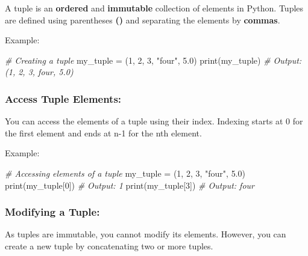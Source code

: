\documentclass[11pt]{article}
\newenvironment{Shaded}{}{}
\newcommand{\DecValTok}[1]{\textcolor[rgb]{0.25,0.63,0.44}{{#1}}}
\newcommand{\FloatTok}[1]{\textcolor[rgb]{0.25,0.63,0.44}{{#1}}}
\newcommand{\StringTok}[1]{\textcolor[rgb]{0.25,0.44,0.63}{{#1}}}
\newcommand{\CommentTok}[1]{\textcolor[rgb]{0.38,0.63,0.69}{\textit{{#1}}}}
\newcommand{\NormalTok}[1]{{#1}}
\newcommand{\OperatorTok}[1]{\textcolor[rgb]{0.40,0.40,0.40}{{#1}}}
\newcommand{\BuiltInTok}[1]{{#1}}
\begin{document}
A tuple is an \textbf{ordered} and \textbf{immutable} collection of
elements in Python. Tuples are defined using parentheses \textbf{()} and
separating the elements by \textbf{commas}.

Example:

\begin{Shaded}
\begin{Highlighting}[]
\CommentTok{\# Creating a tuple}
\NormalTok{my\_tuple }\OperatorTok{=}\NormalTok{ (}\DecValTok{1}\NormalTok{, }\DecValTok{2}\NormalTok{, }\DecValTok{3}\NormalTok{, }\StringTok{"four"}\NormalTok{, }\FloatTok{5.0}\NormalTok{)}
\BuiltInTok{print}\NormalTok{(my\_tuple)  }\CommentTok{\# Output: (1, 2, 3, \textquotesingle{}four\textquotesingle{}, 5.0)}
\end{Highlighting}
\end{Shaded}

\hypertarget{access-tuple-elements}{%
\subsubsection{Access Tuple Elements:}\label{access-tuple-elements}}

You can access the elements of a tuple using their index. Indexing
starts at 0 for the first element and ends at n-1 for the nth element.

Example:

\begin{Shaded}
\begin{Highlighting}[]
\CommentTok{\# Accessing elements of a tuple}
\NormalTok{my\_tuple }\OperatorTok{=}\NormalTok{ (}\DecValTok{1}\NormalTok{, }\DecValTok{2}\NormalTok{, }\DecValTok{3}\NormalTok{, }\StringTok{"four"}\NormalTok{, }\FloatTok{5.0}\NormalTok{)}
\BuiltInTok{print}\NormalTok{(my\_tuple[}\DecValTok{0}\NormalTok{])  }\CommentTok{\# Output: 1}
\BuiltInTok{print}\NormalTok{(my\_tuple[}\DecValTok{3}\NormalTok{])  }\CommentTok{\# Output: \textquotesingle{}four\textquotesingle{}}
\end{Highlighting}
\end{Shaded}

\hypertarget{modifying-a-tuple}{%
\subsubsection{Modifying a Tuple:}\label{modifying-a-tuple}}

As tuples are immutable, you cannot modify its elements. However, you
can create a new tuple by concatenating two or more tuples.
\end{document}
